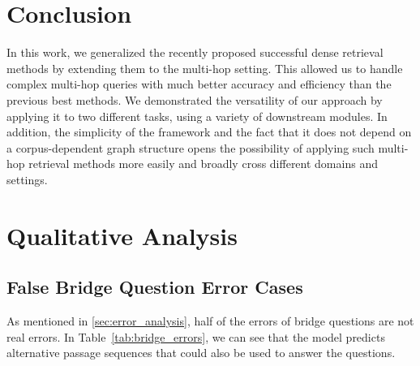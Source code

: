 \documentclass{article} \usepackage{iclr2021_conference,times}
\begin{document}
\section{Conclusion}
In this work, we generalized the recently proposed successful dense retrieval methods by extending them to the multi-hop setting.  This allowed us to handle complex multi-hop queries with much better accuracy and efficiency than the previous best methods.  We demonstrated the versatility of our approach by applying it to two different tasks, using a variety of downstream modules.  In addition, the simplicity of the framework and the fact that it does not depend on a corpus-dependent graph structure opens the possibility of applying such multi-hop retrieval methods more easily and broadly cross different domains and settings.



\clearpage









\clearpage

\appendix
\section{Qualitative Analysis}

\subsection{False Bridge Question Error Cases}
\label{sec:false_errors}
As mentioned in \cref{sec:error_analysis}, half of the errors of bridge questions are not real errors. In Table~\ref{tab:bridge_errors}, we can see that the model predicts alternative passage sequences that could also be used to answer the questions.
\end{document}
